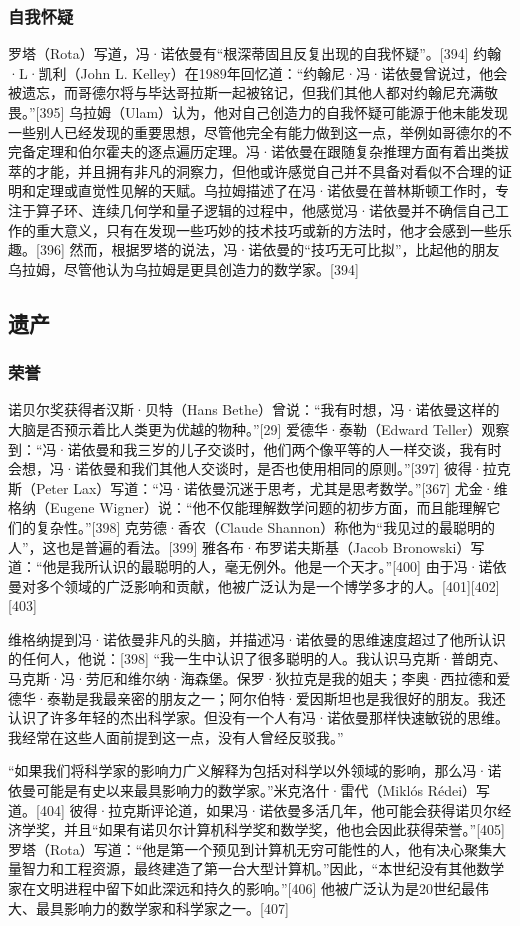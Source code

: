 \subsubsection{自我怀疑}  
罗塔（Rota）写道，冯·诺依曼有“根深蒂固且反复出现的自我怀疑”。[394] 约翰·L·凯利（John L. Kelley）在1989年回忆道：“约翰尼·冯·诺依曼曾说过，他会被遗忘，而哥德尔将与毕达哥拉斯一起被铭记，但我们其他人都对约翰尼充满敬畏。”[395] 乌拉姆（Ulam）认为，他对自己创造力的自我怀疑可能源于他未能发现一些别人已经发现的重要思想，尽管他完全有能力做到这一点，举例如哥德尔的不完备定理和伯尔霍夫的逐点遍历定理。冯·诺依曼在跟随复杂推理方面有着出类拔萃的才能，并且拥有非凡的洞察力，但他或许感觉自己并不具备对看似不合理的证明和定理或直觉性见解的天赋。乌拉姆描述了在冯·诺依曼在普林斯顿工作时，专注于算子环、连续几何学和量子逻辑的过程中，他感觉冯·诺依曼并不确信自己工作的重大意义，只有在发现一些巧妙的技术技巧或新的方法时，他才会感到一些乐趣。[396] 然而，根据罗塔的说法，冯·诺依曼的“技巧无可比拟”，比起他的朋友乌拉姆，尽管他认为乌拉姆是更具创造力的数学家。[394]
\subsection{遗产}  
\subsubsection{荣誉}  
诺贝尔奖获得者汉斯·贝特（Hans Bethe）曾说：“我有时想，冯·诺依曼这样的大脑是否预示着比人类更为优越的物种。”[29] 爱德华·泰勒（Edward Teller）观察到：“冯·诺依曼和我三岁的儿子交谈时，他们两个像平等的人一样交谈，我有时会想，冯·诺依曼和我们其他人交谈时，是否也使用相同的原则。”[397] 彼得·拉克斯（Peter Lax）写道：“冯·诺依曼沉迷于思考，尤其是思考数学。”[367] 尤金·维格纳（Eugene Wigner）说：“他不仅能理解数学问题的初步方面，而且能理解它们的复杂性。”[398] 克劳德·香农（Claude Shannon）称他为“我见过的最聪明的人”，这也是普遍的看法。[399] 雅各布·布罗诺夫斯基（Jacob Bronowski）写道：“他是我所认识的最聪明的人，毫无例外。他是一个天才。”[400] 由于冯·诺依曼对多个领域的广泛影响和贡献，他被广泛认为是一个博学多才的人。[401][402][403]

维格纳提到冯·诺依曼非凡的头脑，并描述冯·诺依曼的思维速度超过了他所认识的任何人，他说：[398]  
“我一生中认识了很多聪明的人。我认识马克斯·普朗克、马克斯·冯·劳厄和维尔纳·海森堡。保罗·狄拉克是我的姐夫；李奥·西拉德和爱德华·泰勒是我最亲密的朋友之一；阿尔伯特·爱因斯坦也是我很好的朋友。我还认识了许多年轻的杰出科学家。但没有一个人有冯·诺依曼那样快速敏锐的思维。我经常在这些人面前提到这一点，没有人曾经反驳我。”

“如果我们将科学家的影响力广义解释为包括对科学以外领域的影响，那么冯·诺依曼可能是有史以来最具影响力的数学家。”米克洛什·雷代（Miklós Rédei）写道。[404] 彼得·拉克斯评论道，如果冯·诺依曼多活几年，他可能会获得诺贝尔经济学奖，并且“如果有诺贝尔计算机科学奖和数学奖，他也会因此获得荣誉。”[405] 罗塔（Rota）写道：“他是第一个预见到计算机无穷可能性的人，他有决心聚集大量智力和工程资源，最终建造了第一台大型计算机。”因此，“本世纪没有其他数学家在文明进程中留下如此深远和持久的影响。”[406] 他被广泛认为是20世纪最伟大、最具影响力的数学家和科学家之一。[407]


